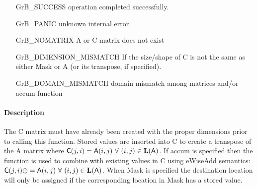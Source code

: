 \begin{itemize}[leftmargin=2.1in]
\item[{\sf GrB\_SUCCESS}]     operation completed successfully.
\item[{\sf GrB\_PANIC}]        unknown internal error.
\item[{\sf GrB\_NOMATRIX}]   {\sf A} or {\sf C} matrix does not exist
\item[{\sf GrB\_DIMENSION\_MISMATCH}]      
        If the size/shape of {\sf C} is not the same as either {\sf Mask} or {\sf A} (or its transpose, if specified).
\item[{\sf GrB\_DOMAIN\_MISMATCH}]  
        domain mismatch among matrices and/or
        accum function 
\end{itemize}

\paragraph{Description}


The {\sf C} matrix must have already been created with the proper dimensions
prior to calling this function.  Stored values are inserted into {\sf C} to
create a transpose of the {\sf A} matrix where 
${\sf C}(j,i) = {\sf A}(i,j) ~ \forall ~ (i,j) \in \bold{L}({\sf A})$.
If accum is specified then the function is used to combine with existing values in {\sf C} using {\sf eWiseAdd} semantics:
${\sf C}(j,i) \oplus = {\sf A}(i,j) ~ \forall ~ (i,j) \in \bold{L}({\sf A})$.
When {\sf Mask} is specified the destination location will only be assigned if the corresponding location in {\sf Mask} has a stored value.
